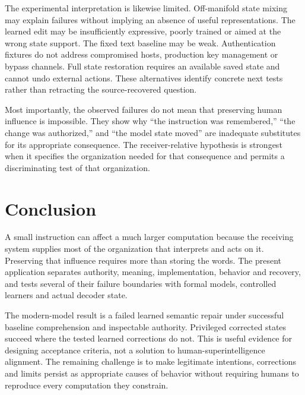 \documentclass[11pt,letterpaper]{article}
\begin{document}
The experimental interpretation is likewise limited. Off-manifold state mixing may explain failures without implying an absence of useful representations. The learned edit may be insufficiently expressive, poorly trained or aimed at the wrong state support. The fixed text baseline may be weak. Authentication fixtures do not address compromised hosts, production key management or bypass channels. Full state restoration requires an available saved state and cannot undo external actions. These alternatives identify concrete next tests rather than retracting the source-recovered question.

Most importantly, the observed failures do not mean that preserving human influence is impossible. They show why “the instruction was remembered,” “the change was authorized,” and “the model state moved” are inadequate substitutes for its appropriate consequence. The receiver-relative hypothesis is strongest when it specifies the organization needed for that consequence and permits a discriminating test of that organization.

\section{Conclusion}

A small instruction can affect a much larger computation because the receiving system supplies most of the organization that interprets and acts on it. Preserving that influence requires more than storing the words. The present application separates authority, meaning, implementation, behavior and recovery, and tests several of their failure boundaries with formal models, controlled learners and actual decoder state.

The modern-model result is a failed learned semantic repair under successful baseline comprehension and inspectable authority. Privileged corrected states succeed where the tested learned corrections do not. This is useful evidence for designing acceptance criteria, not a solution to human-superintelligence alignment. The remaining challenge is to make legitimate intentions, corrections and limits persist as appropriate causes of behavior without requiring humans to reproduce every computation they constrain.
\end{document}
